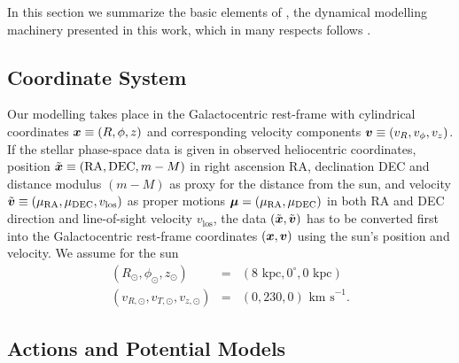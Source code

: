 




In this section we summarize the basic elements of \RM{}, the dynamical modelling machinery presented in this work, which in many respects follows \citet{2013ApJ...779..115B}.

\subsection{Coordinate System} \label{sec:coordinates}

Our modelling takes place in the Galactocentric rest-frame with cylindrical coordinates $\boldsymbol{x} \equiv (R,\phi,z)$ and corresponding velocity components $\boldsymbol{v} \equiv (v_R,v_\phi,v_z)$. If the stellar phase-space data is given in observed heliocentric coordinates, position $\tilde{\boldsymbol{x}} \equiv(\text{RA},\text{DEC},m-M)$ in right ascension RA, declination DEC and distance modulus $(m-M)$ as proxy for the distance from the sun, and velocity $\tilde{\boldsymbol{v}} \equiv (\mu_\text{RA},\mu_\text{DEC},v_\text{los})$ as proper motions $\boldsymbol{\mu}=(\mu_\text{RA},\mu_\text{DEC})$  in both RA and DEC direction and line-of-sight velocity $v_\text{los}$, the data $(\tilde{\boldsymbol{x}},\tilde{\boldsymbol{v}})$ has to be converted first into the Galactocentric rest-frame coordinates $(\boldsymbol{x},\boldsymbol{v})$ using the sun's position and velocity. We assume for the sun
\begin{eqnarray*}
(R_\odot,\phi_\odot,z_\odot) &=&(8 \text{ kpc}, 0^\circ, 0 \text{ kpc})\\
(v_{R,\odot},v_{T,\odot},v_{z,\odot}) &=& (0,230,0) \text{ km s}^{-1}.
\end{eqnarray*}

\subsection{Actions and Potential Models}  \label{sec:potentials}

